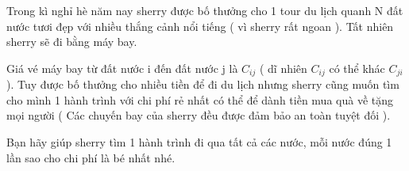 Trong kì nghỉ hè năm nay sherry được bố thưởng cho 1 tour du lịch quanh N đất nước tươi đẹp với nhiều thắng cảnh nổi tiếng ( vì sherry rất ngoan ). Tất nhiên sherry sẽ đi bằng máy bay.  

   Giá vé máy bay từ đất nước i đến đất nước j là $C_{ij}$   ( dĩ nhiên $C_{ij}$   có thể khác $C_{ji}$   ). Tuy được bố thưởng cho nhiều tiền để đi du lịch nhưng sherry cũng muốn tìm cho mình 1 hành trình với chi phí rẻ nhất có thể để dành tiền mua quà về tặng mọi người  ( Các chuyến bay của sherry đều được đảm bảo an toàn tuyệt đối ).  

   Bạn hãy giúp sherry tìm 1 hành trình đi qua tất cả các nước, mỗi nước đúng 1 lần sao cho chi phí là bé nhất nhé.